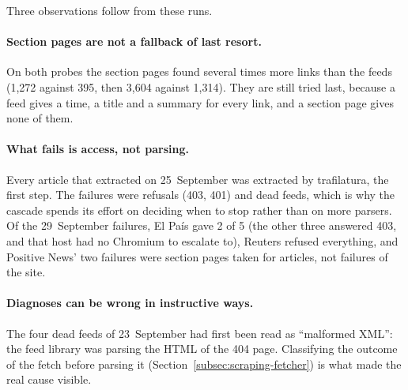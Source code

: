 Three observations follow from these runs.

\paragraph{Section pages are not a fallback of last resort.} On both
probes the section pages found several times more links than the feeds
(1,272 against 395, then 3,604 against 1,314). They are still tried
last, because a feed gives a time, a title and a summary for every
link, and a section page gives none of them.

\paragraph{What fails is access, not parsing.} Every article that
extracted on 25~September was extracted by trafilatura, the first
step. The failures were refusals (403, 401) and dead feeds, which is
why the cascade spends its effort on deciding when to stop rather than
on more parsers. Of the 29~September failures, El País gave 2 of 5
(the other three answered 403, and that host had no Chromium to
escalate to), Reuters refused everything, and Positive News' two
failures were section pages taken for articles, not failures of the
site.

\paragraph{Diagnoses can be wrong in instructive ways.} The four dead
feeds of 23~September had first been read as ``malformed XML'': the
feed library was parsing the HTML of the 404 page. Classifying the
outcome of the fetch before parsing it (Section~\ref{subsec:scraping-fetcher})
is what made the real cause visible.
